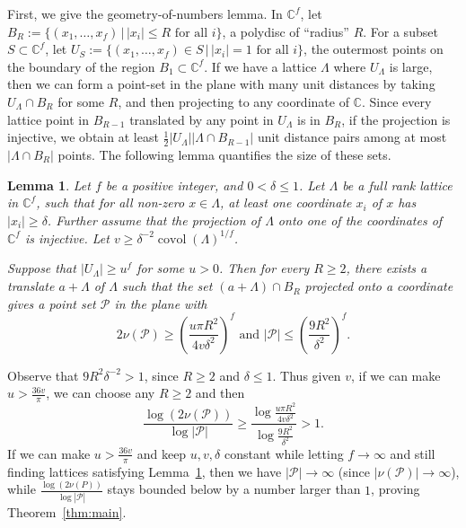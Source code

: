 \documentclass[11pt,reqno]{amsart}
\numberwithin{equation}{section}
\newtheorem{lemma}[lemma]{Lemma}
\theoremstyle{definition}
\theoremstyle{remark}
\newcommand{\mc}{\mathcal}
\newcommand{\C}{\mathbb{C}}
\begin{document}
First, we give the geometry-of-numbers lemma.
In $\C^f$, let $B_R:=\{(x_1,\dots,x_f)\,|\, |x_i|\leq R \textrm{ for all $i$}\}$, a polydisc of ``radius'' $R$.
For a subset $S\subset \C^f$, let $U_S:=\{(x_1,\dots,x_f)\in S\,|\, |x_i|=1 \textrm{ for all $i$}\}$, the outermost points on the boundary of the region $B_1 \subset \C^f$.
If we have a lattice $\Lambda$ where $U_\Lambda$ is large, then we can form a point-set in the plane with many unit distances by taking $U_\Lambda\cap B_R$ for some $R$, and then projecting to any coordinate of $\C$.
Since every lattice point in $B_{R-1}$ translated by any point in $U_\Lambda$ is in 
$B_{R}$, if the projection is injective, we obtain at least $\frac{1}{2}|U_\Lambda||\Lambda\cap B_{R-1}|$
unit distance pairs among at most $|\Lambda\cap B_{R}|$ points.  
The following lemma quantifies the size of these sets.

\begin{lemma}\label{L:unit_expansion}
    Let $f$ be a positive integer, and $0<\delta\leq 1$.  Let $\Lambda$ be a full rank lattice in $\C^f$, such that for all non-zero $x\in \Lambda$, at least one coordinate $x_i$ of $x$ has $|x_i|\geq \delta$.  Further assume that the projection of $\Lambda$ onto one of the coordinates of $\C^f$ is injective.  
    Let $v\geq\delta^{-2}\operatorname{covol}(\Lambda)^{1/f}$.  
    
    Suppose that $|U_\Lambda|\geq u^f$ for some $u>0$.
    Then for every $R\geq 2$,
    there exists a translate $a+\Lambda$ of $\Lambda$ such that
    the set $(a+\Lambda)\cap B_R$ projected onto a coordinate gives a point set $\mc{P}$ in the plane with 
    $$
     2\nu(\mc{P})\geq \left(\frac{u \pi R^2}{4v\delta^{2}}\right)^f \textrm{ and } |\mc{P}|\leq\left(\frac{9R^2}{\delta^2}\right)^{f}.
    $$
\end{lemma}
Observe that $9R^2\delta^{-2}>1$, since $R\ge 2$ and $\delta\le 1$.
Thus given $v$, if we can make $u>\frac{36v}{\pi}$, we can choose any $R\ge 2$ and then
\begin{equation}
\label{explicit-general}
\frac{\log(2\nu(\mc{P}))}{\log|\mc{P}|}\geq \frac{\log \frac{u \pi R^2}{4v\delta^{2}}}{\log \frac{9R^2}{\delta^2}}>1.
\end{equation}
If we can make $u>\frac{36v}{\pi}$ and keep $u,v,\delta$ constant while letting $f\rightarrow\infty$ and still finding  lattices satisfying Lemma~\ref{L:unit_expansion}, then we have $|\mc{P}|\rightarrow\infty$
(since $|\nu(\mc{P})|\rightarrow\infty$),
while $\frac{\log(2\nu(P))}{\log|\mc{P}|}$ stays bounded below by a number larger than $1$, proving Theorem~\ref{thm:main}.
\end{document}
